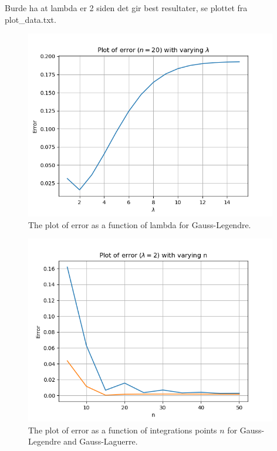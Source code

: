 \documentclass{article}
\begin{document}
  Burde ha at lambda er 2 siden det gir best resultater, se plottet fra plot\_data.txt.


  \begin{figure}[ht]
  	\centering
    \includegraphics[width = 11cm]{images/error-lambda.png}
  	\caption{The plot of error as a function of lambda for Gauss-Legendre. }
    \label{fig:lambdapng}
  \end{figure}

  \begin{figure}[ht]
    \centering
    \includegraphics[width = 11cm]{images/error-integrationpoints.png}
    \caption{The plot of error as a function of integrations points $n$ for Gauss-Legendre and Gauss-Laguerre. }
    \label{fig:integrationpointspng}
  \end{figure}
\end{document}
